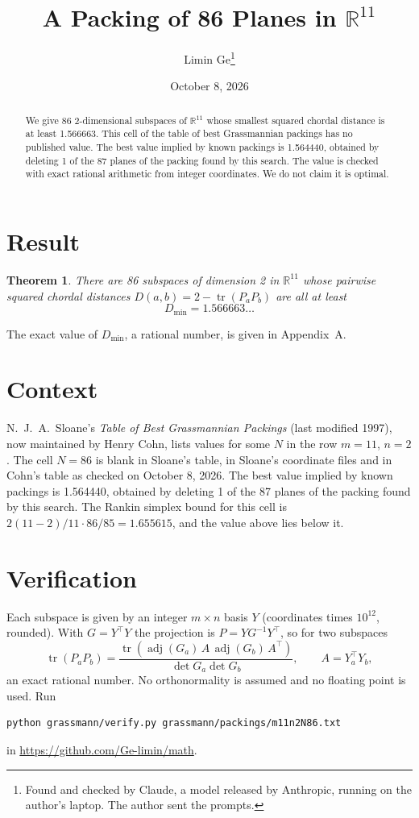 \documentclass[11pt,a4paper]{article}
\title{A Packing of 86 Planes in $\mathbb{R}^{11}$}
\author{Limin Ge\thanks{Found and checked by Claude, a model released by Anthropic, running on the author's laptop. The author sent the prompts.}}
\date{October 8, 2026}
\newtheorem*{theorem}{Theorem}
\begin{document}
\maketitle
\begin{abstract}
We give 86 2-dimensional subspaces of $\mathbb{R}^{11}$ whose smallest squared chordal distance is at least 1.566663. This cell of the table of best Grassmannian packings has no published value. The best value implied by known packings is 1.564440, obtained by deleting 1 of the 87 planes of the packing found by this search. The value is checked with exact rational arithmetic from integer coordinates. We do not claim it is optimal.
\end{abstract}

\section{Result}
\begin{theorem}
There are 86 subspaces of dimension 2 in $\mathbb{R}^{11}$ whose pairwise squared chordal distances $D(a,b) = 2 - \operatorname{tr}(P_aP_b)$ are all at least
\[ D_{\min} = 1.566663\ldots \]
\end{theorem}
The exact value of $D_{\min}$, a rational number, is given in Appendix~A.


\section{Context}
N.~J.~A.~Sloane's \emph{Table of Best Grassmannian Packings} (last modified 1997), now maintained by Henry Cohn, lists values for some $N$ in the row $m=11$, $n=2$. The cell $N=86$ is blank in Sloane's table, in Sloane's coordinate files and in Cohn's table as checked on October 8, 2026. The best value implied by known packings is 1.564440, obtained by deleting 1 of the 87 planes of the packing found by this search. The Rankin simplex bound for this cell is $2(11-2)/11\cdot 86/85 = 1.655615$, and the value above lies below it.


\section{Verification}
Each subspace is given by an integer $m\times n$ basis $Y$ (coordinates times $10^{12}$, rounded). With $G=Y^\top Y$ the projection is $P=YG^{-1}Y^\top$, so for two subspaces
\[ \operatorname{tr}(P_aP_b)=\frac{\operatorname{tr}(\operatorname{adj}(G_a)\,A\,\operatorname{adj}(G_b)\,A^\top)}{\det G_a\det G_b},\qquad A=Y_a^\top Y_b, \]
an exact rational number. No orthonormality is assumed and no floating point is used. Run
\begin{verbatim}
python grassmann/verify.py grassmann/packings/m11n2N86.txt
\end{verbatim}
in \url{https://github.com/Ge-limin/math}.
\end{document}
